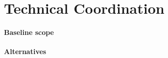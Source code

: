 \chapter{Technical Coordination}
\label{ch:fddp-coord}






\subsubsection{Baseline scope}
\label{sec:fddp-coord-integ-test-base}

\subsubsection{Alternatives}
\label{sec:fddp-coord-integ-test-alt}

